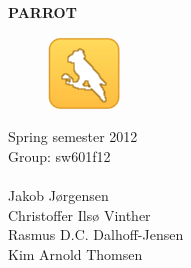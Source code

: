 
\begin{center}


\textbf{\fontsize{35}{70}\selectfont\sffamily PARROT\\ \vspace{1cm}}





\end{center}

\begin{figure}[htb]
\begin{center}
\includegraphics[scale=5.00]{input/images/ic_launcher.png}
\end{center}
\end{figure}



\huge {Spring semester 2012}\\

\LARGE{Group: sw601f12}
\normalsize \\ \\
Jakob J\o{}rgensen\\
Christoffer Ils\o{} Vinther\\
Rasmus D.C. Dalhoff-Jensen\\
Kim Arnold Thomsen